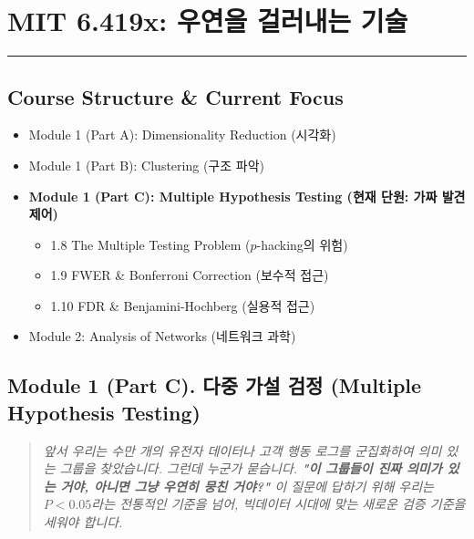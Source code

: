 \documentclass[11pt,a4paper]{book}
\theoremstyle{definition}
\begin{document}
\chapter{MIT 6.419x: 우연을 걸러내는 기술}
\label{ch:lecture3}


\vspace{1cm}
\hrule
\vspace{1cm}

\section*{Course Structure \& Current Focus}
\begin{itemize}
    \item Module 1 (Part A): Dimensionality Reduction (시각화)
    \item Module 1 (Part B): Clustering (구조 파악)
    \item \textbf{\textcolor{mainblue}{Module 1 (Part C): Multiple Hypothesis Testing (현재 단원: 가짜 발견 제어)}}
    \begin{itemize}
        \item 1.8 The Multiple Testing Problem ($p$-hacking의 위험)
        \item 1.9 FWER \& Bonferroni Correction (보수적 접근)
        \item 1.10 FDR \& Benjamini-Hochberg (실용적 접근)
    \end{itemize}
    \item Module 2: Analysis of Networks (네트워크 과학)
\end{itemize}


\section{Module 1 (Part C). 다중 가설 검정 (Multiple Hypothesis Testing)}

\begin{quote}
\textit{앞서 우리는 수만 개의 유전자 데이터나 고객 행동 로그를 군집화하여 의미 있는 그룹을 찾았습니다. 그런데 누군가 묻습니다. \textbf{"이 그룹들이 진짜 의미가 있는 거야, 아니면 그냥 우연히 뭉친 거야?"} 이 질문에 답하기 위해 우리는 $P < 0.05$라는 전통적인 기준을 넘어, 빅데이터 시대에 맞는 새로운 검증 기준을 세워야 합니다.}
\end{quote}
\end{document}
